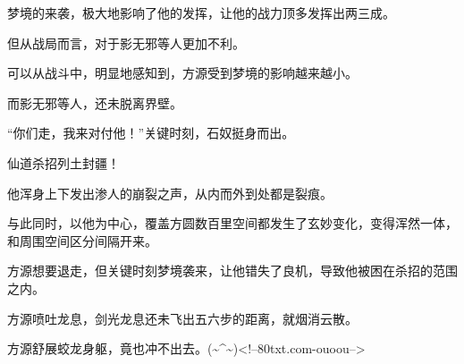 \begin{this_body}
梦境的来袭，极大地影响了他的发挥，让他的战力顶多发挥出两三成。

但从战局而言，对于影无邪等人更加不利。

可以从战斗中，明显地感知到，方源受到梦境的影响越来越小。

而影无邪等人，还未脱离界壁。

“你们走，我来对付他！”关键时刻，石奴挺身而出。

仙道杀招列土封疆！

他浑身上下发出渗人的崩裂之声，从内而外到处都是裂痕。

与此同时，以他为中心，覆盖方圆数百里空间都发生了玄妙变化，变得浑然一体，和周围空间区分间隔开来。

方源想要退走，但关键时刻梦境袭来，让他错失了良机，导致他被困在杀招的范围之内。

方源喷吐龙息，剑光龙息还未飞出五六步的距离，就烟消云散。

方源舒展蛟龙身躯，竟也冲不出去。(\~{}\^{}\~{})<!--80txt.com-ouoou-->

\end{this_body}

